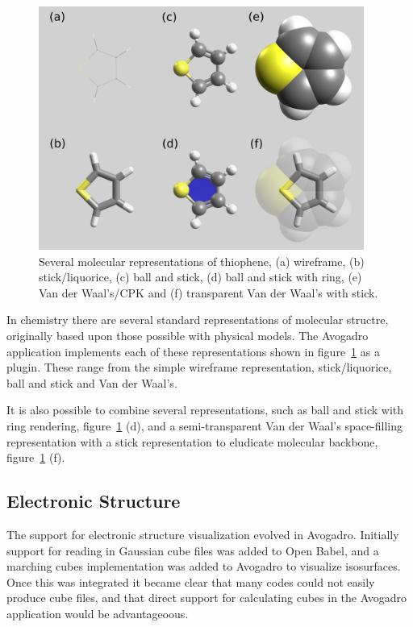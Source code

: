\documentclass[10pt]{bmc_article}
\newenvironment{bmcformat}{\begin{raggedright}
\baselineskip20pt\sloppy\setboolean{publ}{false}}{\end{raggedright}
\baselineskip20pt\sloppy}
\begin{document}
\begin{bmcformat}
\begin{figure}
  \includegraphics[width=0.95\textwidth]{images/standardRepsLabel}
  \caption{Several molecular representations of thiophene, (a) wireframe,
    (b) stick/liquorice, (c) ball and stick, (d) ball and stick with ring,
    (e) Van der Waal's/CPK and (f) transparent Van der Waal's with stick.}
  \label{f:standardReps}
\end{figure}

In chemistry there are several standard representations of molecular structre,
originally based upon those possible with physical models. The Avogadro
application implements each of these representations shown in
figure~\ref{f:standardReps} as a plugin. These range from the simple wireframe
representation, stick/liquorice, ball and stick and Van der Waal's.

It is also possible to combine several representations, such as ball and stick
with ring rendering, figure~\ref{f:standardReps} (d), and a semi-transparent Van
der Waal's space-filling representation with a stick representation to eludicate
molecular backbone, figure~\ref{f:standardReps} (f).

\subsection{Electronic Structure}

The support for electronic structure visualization evolved in Avogadro.
Initially support for reading in Gaussian cube files was added to Open Babel,
and a marching cubes implementation was added to Avogadro to visualize
isosurfaces. Once this was integrated it became clear that many codes could not
easily produce cube files, and that direct support for calculating cubes in the
Avogadro application would be advantageoous.


\end{bmcformat}
\end{document}

